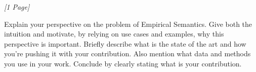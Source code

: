 \textit{[1 Page]}

\noindent
Explain your perspective on the problem of Empirical Semantics. 
Give both the intuition and motivate, by relying on use cases and examples, why this perspective is important. 
Briefly describe what is the state of the art and how you’re pushing it with your contribution. 
Also mention what data and methods you use in your work. 
Conclude by clearly stating what is your contribution.
